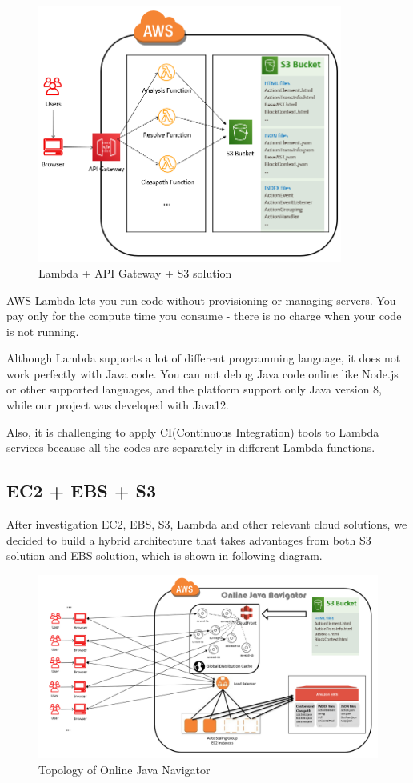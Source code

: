 \documentclass[runningheads]{llncs}
\begin{document}
\begin{figure}[H]
	\centering
	\includegraphics[width=10cm]{pic/lambda-s3.png}
	\caption{Lambda + API Gateway + S3 solution}
	\label{Lambda + API Gateway + S3 solution}
\end{figure}

AWS Lambda lets you run code without provisioning or managing servers. You pay only for the compute time you consume - there is no charge when your code is not running.

Although Lambda supports a lot of different programming language, it does not work perfectly with Java code. You can not debug Java code online like Node.js or other supported languages, and the platform support only Java version 8, while our project was developed with Java12.

Also, it is challenging to apply CI(Continuous Integration)\cite{Continuous_integration} tools to Lambda services because all the codes are separately in different Lambda functions.

\subsection{EC2 + EBS + S3}

After investigation EC2, EBS, S3, Lambda and other relevant cloud solutions, we decided to build a hybrid architecture that takes advantages from both S3 solution and EBS solution, which is shown in following diagram.

\begin{figure}[H]
	\centering
	\includegraphics[width=12cm]{pic/ojn-cloud-solution.png}
	\caption{Topology of Online Java Navigator}
	\label{Topology of Online Java Navigator}
\end{figure}
\end{document}
